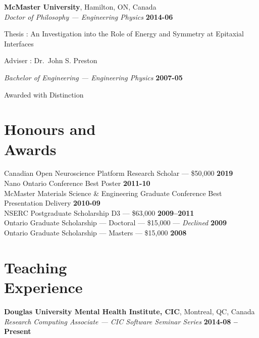\documentclass[margin1,line,canadian]{resume}
\begin{document}
\begin{resume}
 \textbf{McMaster University}, Hamilton, ON, Canada\\\vspace{2mm}%
 \textsl{Doctor of Philosophy --- Engineering Physics} \hfill \textbf{2014-06}\vspace{-3mm}\\\vspace{-1mm}%
 \begin{list2}
  \item Thesis : An Investigation into the Role of Energy and Symmetry at Epitaxial Interfaces
  \item Adviser : Dr.~John S. Preston
 \end{list2}\vspace{-1.5mm}
 \textsl{Bachelor of Engineering --- Engineering Physics} \hfill \textbf{2007-05}\vspace{-3mm}\\\vspace{-1mm}
 \begin{list2}
  \item Awarded with Distinction
 \end{list2}

 \section{\mysidestyle{}Honours and\\Awards}
 Canadian Open Neuroscience Platform Research Scholar --- \$50,000 \hfill \textbf{2019}\\
 Nano Ontario Conference Best Poster \hfill \textbf{2011-10}\\%
 McMaster Materials Science \& Engineering Graduate Conference Best Presentation Delivery \hfill \textbf{2010-09}\\%
 NSERC Postgraduate Scholarship D3 --- \$63,000 \hfill \textbf{2009--2011}\\%
 Ontario Graduate Scholarship --- Doctoral --- \$15,000 --- \textsl{Declined} \hfill \textbf{2009} \\%
 Ontario Graduate Scholarship --- Masters --- \$15,000 \hfill \textbf{2008}\\

 \section{\mysidestyle{}Teaching\\Experience}
 \textbf{Douglas University Mental Health Institute, CIC}, Montreal, QC, Canada \\%
 \textsl{Research Computing Associate --- CIC Software Seminar Series} \hfill \textbf{2014-08 -- Present}


\end{resume}
\end{document}
